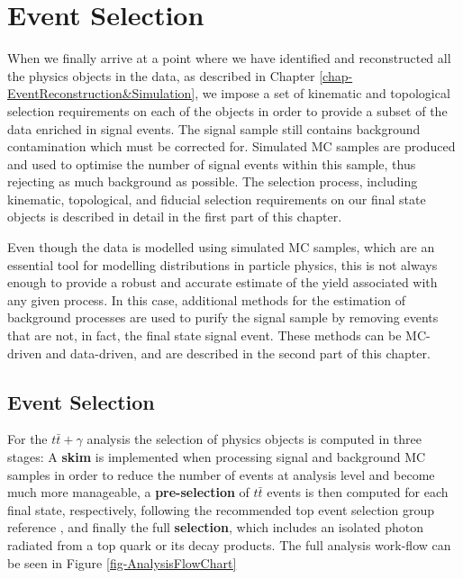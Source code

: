 \chapter{Event Selection} \label{chap-EventSelection}

When we finally arrive at a point where we have identified and reconstructed all the physics objects in the data, as described in Chapter \ref{chap-EventReconstruction&Simulation}, we impose a set of kinematic and topological selection requirements on each of the objects in order to provide a subset of the data enriched in signal events. The signal sample still contains background contamination which must be corrected for. Simulated MC samples are produced and used to optimise the number of signal events within this sample, thus rejecting as much background as possible. The selection process, including kinematic, topological, and fiducial selection requirements on our final state objects is described in detail in the first part of this chapter.

Even though the data is modelled using simulated MC samples, which are an essential tool for modelling distributions in particle physics, this is not always enough to provide a robust and accurate estimate of the yield associated with any given process. In this case, additional methods for the estimation of background processes are used to purify the signal sample by removing events that are not, in fact, the final state signal event. These methods can be MC-driven and data-driven, and are described in the second part of this chapter. 

\section{Event Selection} \label{sec-EventSelection}

For the $t\bar{t}+\gamma$ analysis the selection of physics objects is computed in three stages: A \textbf{skim} is implemented when processing signal and background MC samples in order to reduce the number of events at analysis level and become much more manageable, a \textbf{pre-selection} of $t\bar{t}$ events is then computed for each final state, respectively, following the recommended top event selection group reference \cite{TopEventSelection}, and finally the full \textbf{selection}, which includes an isolated photon radiated from a top quark or its decay products. The full analysis work-flow can be seen in Figure \ref{fig-AnalysisFlowChart}   

